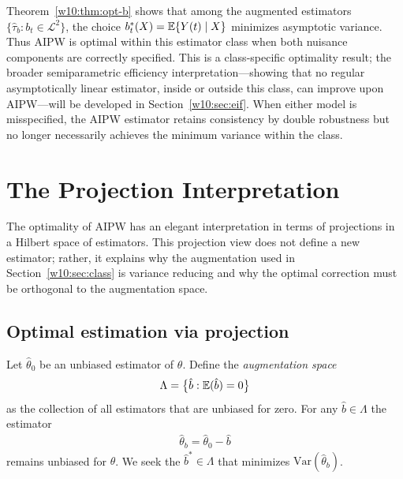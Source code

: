 \documentclass[master.tex]{subfiles}
\begin{document}
\begin{remark}
\label{w10:rem:opt-b-interp}
Theorem~\ref{w10:thm:opt-b} shows that among the augmented estimators
$\{\hat\tau_b : b_t \in \mathcal{L}^2\}$, the choice
$b_t^*(X) = \mathbb{E}\{Y(t)\mid X\}$ minimizes asymptotic variance.  Thus
AIPW is optimal within this estimator class when both nuisance
components are correctly specified.  This is a class-specific
optimality result; the broader semiparametric efficiency
interpretation---showing that no regular asymptotically linear
estimator, inside or outside this class, can improve upon AIPW---will
be developed in Section~\ref{w10:sec:eif}.  When either model is
misspecified, the AIPW estimator retains consistency by double
robustness but no longer necessarily achieves the minimum variance
within the class.
\end{remark}

\section{The Projection Interpretation}
\label{w10:sec:projection}

The optimality of AIPW has an elegant interpretation in terms of
projections in a Hilbert space of estimators.
This projection view does not define a new estimator; rather, it
explains why the augmentation used in Section~\ref{w10:sec:class} is
variance reducing and why the optimal correction must be orthogonal to
the augmentation space.

\subsection{Optimal estimation via projection}
\label{w10:subsec:proj-general}

Let $\hat\theta_0$ be an unbiased estimator of $\theta$.  Define the
\emph{augmentation space}
\[
  \Lambda = \bigl\{\hat b : \mathbb{E}(\hat b) = 0\bigr\}
\]
as the collection of all estimators that are unbiased for zero.  For
any $\hat b \in \Lambda$ the estimator
\begin{align}
  \hat\theta_b = \hat\theta_0 - \hat b
  \label{w10:eq:theta-b}
\end{align}
remains unbiased for $\theta$.  We seek the $\hat b^* \in \Lambda$
that minimizes $\mathrm{Var}(\hat\theta_b)$.
\end{document}
